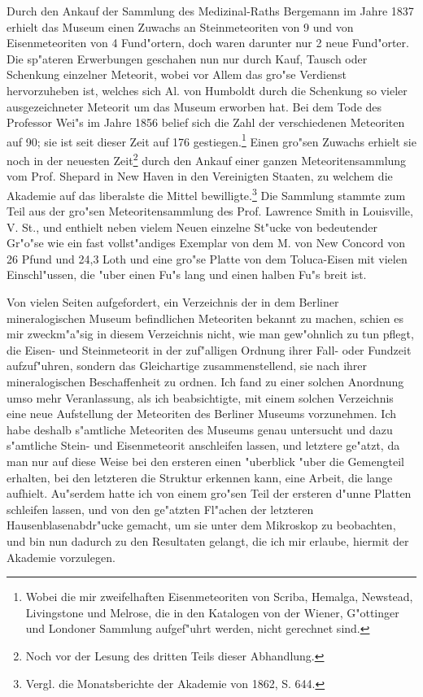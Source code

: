 \documentclass[a4paper, 11pt, oneside]{article}
\begin{document}
Durch den Ankauf der Sammlung des Medizinal-Raths Bergemann im Jahre 1837 erhielt das Museum einen Zuwachs an Steinmeteoriten von 9 und von Eisenmeteoriten von 4 Fund"ortern, doch waren darunter nur 2 neue Fund"orter. Die sp"ateren Erwerbungen geschahen nun nur durch Kauf, Tausch oder Schenkung einzelner Meteorit, wobei vor Allem das gro"se Verdienst hervorzuheben ist, welches sich Al. von Humboldt durch die Schenkung so vieler ausgezeichneter Meteorit um das Museum erworben hat. Bei dem Tode des Professor Wei"s im Jahre 1856 belief sich die Zahl der verschiedenen Meteoriten auf 90; sie ist seit dieser Zeit auf 176 gestiegen.\footnote{Wobei die mir zweifelhaften Eisenmeteoriten von Scriba, Hemalga, Newstead, Livingstone und Melrose, die in den Katalogen von der Wiener, G"ottinger und Londoner Sammlung aufgef"uhrt werden, nicht gerechnet sind.} Einen gro"sen Zuwachs erhielt sie noch in der neuesten Zeit\footnote{Noch vor der Lesung des dritten Teils dieser Abhandlung.} durch den Ankauf einer ganzen Meteoritensammlung vom Prof. Shepard in New Haven in den Vereinigten Staaten, zu welchem die Akademie auf das liberalste die Mittel bewilligte.\footnote{Vergl. die Monatsberichte der Akademie von 1862, S. 644.} Die Sammlung stammte zum Teil aus der gro"sen Meteoritensammlung des Prof. Lawrence Smith in Louisville, V. St., und enthielt neben vielem Neuen einzelne St"ucke von bedeutender Gr"o"se wie ein fast vollst"andiges Exemplar von dem M. von New Concord von 26 Pfund und 24,3 Loth und eine gro"se Platte von dem Toluca-Eisen mit vielen Einschl"ussen, die "uber einen Fu"s lang und einen halben Fu"s breit ist.

Von vielen Seiten aufgefordert, ein Verzeichnis der in dem Berliner mineralogischen Museum befindlichen Meteoriten bekannt zu machen, schien es mir zweckm"a"sig in diesem Verzeichnis nicht, wie man gew"ohnlich zu tun pflegt, die Eisen- und Steinmeteorit in der zuf"alligen Ordnung ihrer Fall- oder Fundzeit aufzuf"uhren, sondern das Gleichartige zusammenstellend, sie nach ihrer mineralogischen Beschaffenheit zu ordnen. Ich fand zu einer solchen Anordnung umso mehr Veranlassung, als ich beabsichtigte, mit einem solchen Verzeichnis eine neue Aufstellung der Meteoriten des Berliner Museums vorzunehmen. Ich habe deshalb s"amtliche Meteoriten des Museums genau untersucht und dazu s"amtliche Stein- und Eisenmeteorit anschleifen lassen, und letztere ge"atzt, da man nur auf diese Weise bei den ersteren einen "uberblick "uber die Gemengteil erhalten, bei den letzteren die Struktur erkennen kann, eine Arbeit, die lange aufhielt. Au"serdem hatte ich von einem gro"sen Teil der ersteren d"unne Platten schleifen lassen, und von den ge"atzten Fl"achen der letzteren Hausenblasenabdr"ucke gemacht, um sie unter dem Mikroskop zu beobachten, und bin nun dadurch zu den Resultaten gelangt, die ich mir erlaube, hiermit der Akademie vorzulegen.
\end{document}
